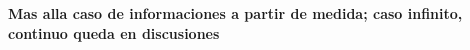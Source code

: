 
\label{sec:SZ:Cuanticas}

{\bf Mas alla caso de informaciones a partir de medida; caso infinito, continuo queda en discusiones}